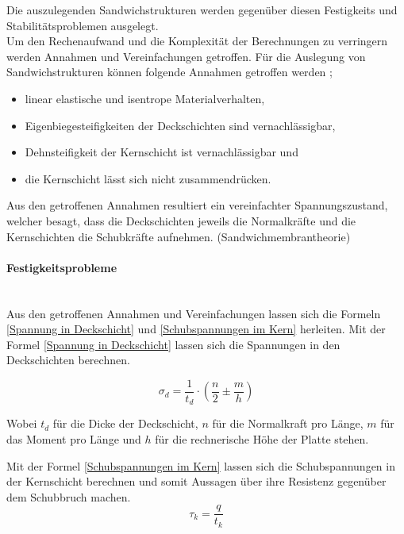   Die auszulegenden Sandwichstrukturen werden gegenüber diesen Festigkeits und Stabilitätsproblemen ausgelegt.\\
  Um den Rechenaufwand und die Komplexität der Berechnungen zu verringern werden Annahmen und Vereinfachungen getroffen. Für die Auslegung von Sandwichstrukturen können folgende Annahmen getroffen werden \cite{klein}\cite{ETH};
  \begin{itemize}
    \item linear elastische und isentrope Materialverhalten,
    \item Eigenbiegesteifigkeiten der Deckschichten sind vernachlässigbar,
    \item Dehnsteifigkeit der Kernschicht ist vernachlässigbar und
    \item die Kernschicht lässt sich nicht zusammendrücken.\\
  \end{itemize}
  Aus den getroffenen Annahmen resultiert ein vereinfachter Spannungszustand, welcher besagt, dass die Deckschichten jeweils die Normalkräfte und die Kernschichten die Schubkräfte aufnehmen. (Sandwichmembrantheorie)

    \paragraph{Festigkeitsprobleme}\mbox{}\\
    Aus den getroffenen Annahmen und Vereinfachungen lassen sich die Formeln \ref{Spannung in Deckschicht} und \ref{Schubspannungen im Kern} herleiten. Mit der Formel \ref{Spannung in Deckschicht} lassen sich die Spannungen in den Deckschichten berechnen.

    \begin{equation}
      \label{Spannung in Deckschicht}
      \sigma_d = \frac{1}{t_d}\cdot \left ( \frac{n}{2} \pm \frac{m}{h}\right )
    \end{equation}

    Wobei $t_d$ für die Dicke der Deckschicht, $n$ für die Normalkraft pro Länge, $m$ für das Moment pro Länge und $h$ für die rechnerische Höhe der Platte stehen.

    Mit der Formel \ref{Schubspannungen im Kern} lassen sich die Schubspannungen in der Kernschicht berechnen und somit Aussagen über ihre Resistenz gegenüber dem Schubbruch machen.
    \begin{equation}
      \label{Schubspannungen im Kern}
      \tau_k = \frac{q}{t_k}
    \end{equation}

